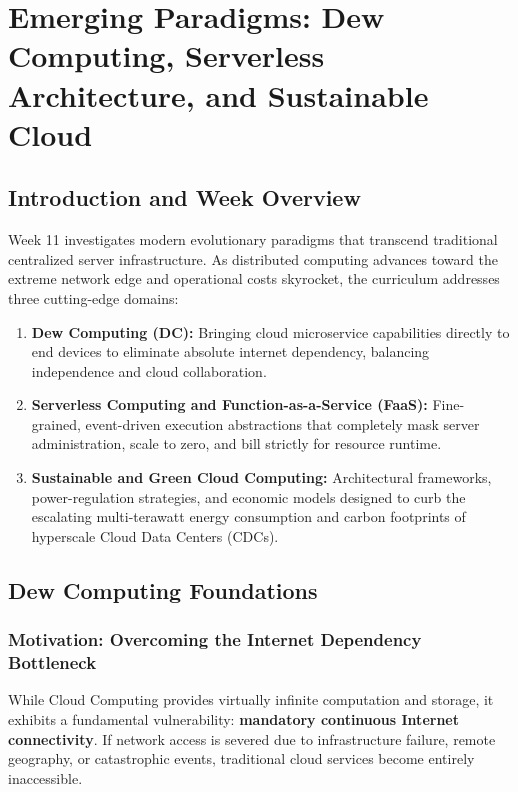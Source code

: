 \chapter{Emerging Paradigms: Dew Computing, Serverless Architecture, and Sustainable Cloud}

\section{Introduction and Week Overview}
Week 11 investigates modern evolutionary paradigms that transcend traditional centralized server infrastructure. As distributed computing advances toward the extreme network edge and operational costs skyrocket, the curriculum addresses three cutting-edge domains:
\begin{enumerate}[leftmargin=*]
  \item \textbf{Dew Computing (DC):} Bringing cloud microservice capabilities directly to end devices to eliminate absolute internet dependency, balancing independence and cloud collaboration.
  \item \textbf{Serverless Computing and Function-as-a-Service (FaaS):} Fine-grained, event-driven execution abstractions that completely mask server administration, scale to zero, and bill strictly for resource runtime.
  \item \textbf{Sustainable and Green Cloud Computing:} Architectural frameworks, power-regulation strategies, and economic models designed to curb the escalating multi-terawatt energy consumption and carbon footprints of hyperscale Cloud Data Centers (CDCs).
\end{enumerate}

\section{Dew Computing Foundations}
\subsection{Motivation: Overcoming the Internet Dependency Bottleneck}
While Cloud Computing provides virtually infinite computation and storage, it exhibits a fundamental vulnerability: \textbf{mandatory continuous Internet connectivity}. If network access is severed due to infrastructure failure, remote geography, or catastrophic events, traditional cloud services become entirely inaccessible.

